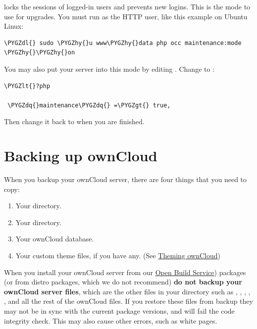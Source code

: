 \documentclass[letterpaper,10pt,english]{sphinxmanual}
\def\PYGZlt{\char`\<}
\def\PYGZgt{\char`\>}
\def\PYGZdl{\char`\$}
\def\PYGZhy{\char`\-}
\def\PYGZdq{\char`\"}
\begin{document}
 locks the sessions of logged-in users and prevents new
logins. This is the mode to use for upgrades. You must run  as the HTTP user,
like this example on Ubuntu Linux:

\begin{Verbatim}[commandchars=\\\{\}]
\PYGZdl{} sudo \PYGZhy{}u www\PYGZhy{}data php occ maintenance:mode \PYGZhy{}\PYGZhy{}on
\end{Verbatim}

You may also put your
server into this mode by editing . Change
 to :

\begin{Verbatim}[commandchars=\\\{\}]
\PYGZlt{}?php

 \PYGZdq{}maintenance\PYGZdq{} =\PYGZgt{} true,
\end{Verbatim}

Then change it back to  when you are finished.


\section{Backing up ownCloud}
\label{maintenance/backup:backing-up-owncloud}\label{maintenance/backup::doc}
When you backup your ownCloud server, there are four things that you need to copy:
\begin{enumerate}
\item {} 
Your  directory.

\item {} 
Your  directory.

\item {} 
Your ownCloud database.

\item {} 
Your custom theme files, if you have any. (See \href{https://doc.owncloud.org/server/9.2/developer\_manual/core/theming.html}{Theming ownCloud})

\end{enumerate}

When you install your ownCloud server from our \href{https://download.owncloud.org/download/repositories/stable/owncloud/}{Open Build Service}) packages (or from distro packages, which we do not recommend) \textbf{do not backup your ownCloud server files}, which are the other files in your  directory such as , , , , , and all the rest of the ownCloud files. If you restore these files from backup they may not be in sync with the current package versions, and will fail the code integrity check. This may also cause other errors, such as white pages.
\end{document}
